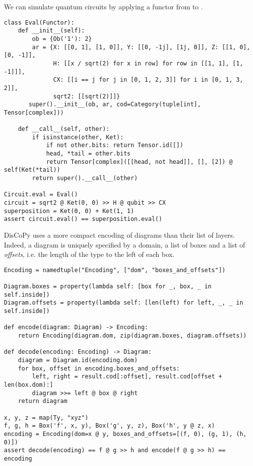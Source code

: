 \begin{example}
We can simulate quantum circuits by applying a functor from  to .
\begin{verbatim}
class Eval(Functor):
    def __init__(self):
        ob = {Ob('1'): 2}
        ar = {X: [[0, 1], [1, 0]], Y: [[0, -1j], [1j, 0]], Z: [[1, 0], [0, -1]],
              H: [[x / sqrt(2) for x in row] for row in [[1, 1], [1, -1]]],
              CX: [[i == j for j in [0, 1, 2, 3]] for i in [0, 1, 3, 2]],
              sqrt2: [[sqrt(2)]]}
       super().__init__(ob, ar, cod=Category(tuple[int], Tensor[complex]))

    def __call__(self, other):
        if isinstance(other, Ket):
            if not other.bits: return Tensor.id([])
            head, *tail = other.bits
            return Tensor[complex]([[head, not head]], [], [2]) @ self(Ket(*tail))
        return super().__call__(other)

Circuit.eval = Eval()
circuit = sqrt2 @ Ket(0, 0) >> H @ qubit >> CX
superposition = Ket(0, 0) + Ket(1, 1)
assert circuit.eval() == superposition.eval()
\end{verbatim}
\end{example}

\begin{remark}
DisCoPy uses a more compact encoding of diagrams than their list of layers.
Indeed, a diagram is uniquely specified by a domain, a list of boxes and a list of \emph{offsets}, i.e. the length of the type to the left of each box.

\begin{verbatim}
Encoding = namedtuple("Encoding", ["dom", "boxes_and_offsets"])

Diagram.boxes = property(lambda self: [box for _, box, _ in self.inside])
Diagram.offsets = property(lambda self: [len(left) for left, _, _ in self.inside])

def encode(diagram: Diagram) -> Encoding:
    return Encoding(diagram.dom, zip(diagram.boxes, diagram.offsets))

def decode(encoding: Encoding) -> Diagram:
    diagram = Diagram.id(encoding.dom)
    for box, offset in encoding.boxes_and_offsets:
        left, right = result.cod[:offset], result.cod[offset + len(box.dom):]
        diagram >>= left @ box @ right
    return diagram

x, y, z = map(Ty, "xyz")
f, g, h = Box('f', x, y), Box('g', y, z), Box('h', y @ z, x)
encoding = Encoding(dom=x @ y, boxes_and_offsets=[(f, 0), (g, 1), (h, 0)])
assert decode(encoding) == f @ g >> h and encode(f @ g >> h) == encoding
\end{verbatim}
\end{remark}

